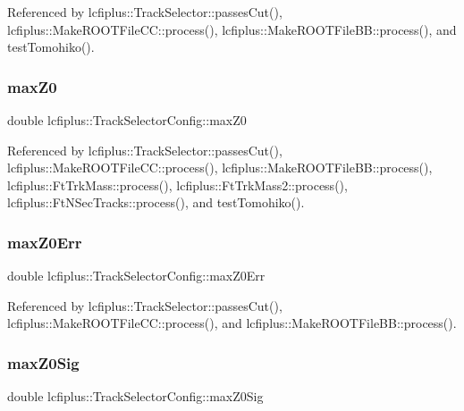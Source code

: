 Referenced by lcfiplus\+::\+Track\+Selector\+::passes\+Cut(), lcfiplus\+::\+Make\+R\+O\+O\+T\+File\+C\+C\+::process(), lcfiplus\+::\+Make\+R\+O\+O\+T\+File\+B\+B\+::process(), and test\+Tomohiko().

\mbox{\label{classlcfiplus_1_1TrackSelectorConfig_a198375709cdb7be2d18240dcf672e6d8}} 
\subsubsection{max\+Z0}
{\footnotesize\ttfamily double lcfiplus\+::\+Track\+Selector\+Config\+::max\+Z0}



Referenced by lcfiplus\+::\+Track\+Selector\+::passes\+Cut(), lcfiplus\+::\+Make\+R\+O\+O\+T\+File\+C\+C\+::process(), lcfiplus\+::\+Make\+R\+O\+O\+T\+File\+B\+B\+::process(), lcfiplus\+::\+Ft\+Trk\+Mass\+::process(), lcfiplus\+::\+Ft\+Trk\+Mass2\+::process(), lcfiplus\+::\+Ft\+N\+Sec\+Tracks\+::process(), and test\+Tomohiko().

\mbox{\label{classlcfiplus_1_1TrackSelectorConfig_ac160a463fafb57e0720e5a1ff142db4d}} 
\subsubsection{max\+Z0\+Err}
{\footnotesize\ttfamily double lcfiplus\+::\+Track\+Selector\+Config\+::max\+Z0\+Err}



Referenced by lcfiplus\+::\+Track\+Selector\+::passes\+Cut(), lcfiplus\+::\+Make\+R\+O\+O\+T\+File\+C\+C\+::process(), and lcfiplus\+::\+Make\+R\+O\+O\+T\+File\+B\+B\+::process().

\mbox{\label{classlcfiplus_1_1TrackSelectorConfig_af45368c9ac28274aeb00506b662e6462}} 
\subsubsection{max\+Z0\+Sig}
{\footnotesize\ttfamily double lcfiplus\+::\+Track\+Selector\+Config\+::max\+Z0\+Sig}



